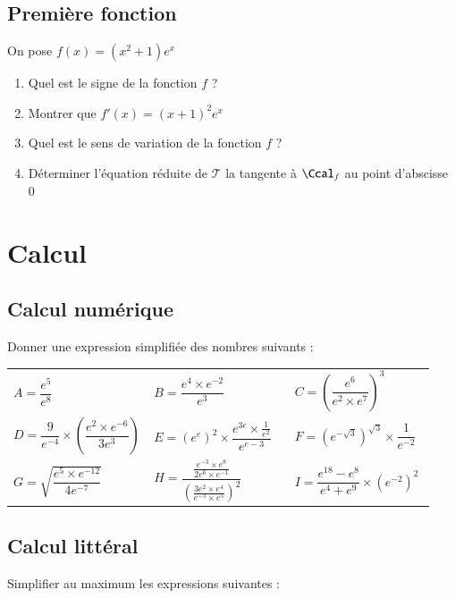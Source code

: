 \documentclass[oneside,12pt]{article}          %
\begin{document}
\subsection{Première fonction}

On pose $f(x)=(x^2+1)e^x$

\begin{enumerate}
    \item Quel est le signe de la fonction $f$ ?
    \item Montrer que $f'(x)=(x+1)^2e^x$
    \item Quel est le sens de variation de la fonction $f$ ?
    \item Déterminer l'équation réduite de $\mathscr{T}$ la tangente à $\Ccal_f$ au point d'abscisse 0
\end{enumerate}



\section{Calcul}


\subsection{Calcul numérique}
Donner une expression simplifiée des nombres suivants :

\renewcommand{\arraystretch}{2.4}
\begin{tabular}{p{0.33\linewidth}p{0.33\linewidth}p{0.33\linewidth}}
    $A = \dfrac{e^5}{e^8}$ & $B = \dfrac{e^4\times e^{-2}}{e^3}$ & $C = \left(\dfrac{e^6}{e^2\times e^7}\right)^3$\\
    $D = \dfrac{9}{e^{-4}}\times\left(\dfrac{e^2\times e^{-6}}{3e^3}\right)$ & $E = \left(e^e\right)^2\times\dfrac{e^{3e}\times\frac{1}{e^2}}{e^{e-3}}$ & $F = \left(e^{-\sqrt{3}}\right)^{\sqrt{3}}\times\dfrac{1}{e^{-2}}$\\
    $G = \sqrt{\dfrac{e^5\times e^{-12}}{4e^{-7}}}$ & $H = \dfrac{\frac{e^{-3}\times e^8}{2e^6\times e^{-1}}}{\left(\frac{3e^2\times e^4}{e^{-3}\times e^5}\right)^2}$ & $I = \dfrac{e^{18}-e^{8}}{e^4+e^9}\times \left(e^{-2}\right)^2$
\end{tabular}



\subsection{Calcul littéral}
Simplifier au maximum les expressions suivantes :
\end{document}
